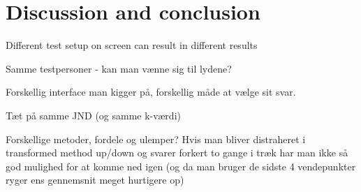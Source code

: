 \section*{Discussion and conclusion}
Different test setup on screen can result in different results

Samme testpersoner - kan man vænne sig til lydene?

Forskellig interface man kigger på, forskellig måde at vælge sit svar. 

Tæt på samme JND (og samme k-værdi)

Forskellige metoder, fordele og ulemper? Hvis man bliver distraheret i transformed method up/down og svarer forkert to gange i træk har man ikke så god mulighed for at komme ned igen (og da man bruger de sidste 4 vendepunkter ryger ens gennemsnit meget hurtigere op)